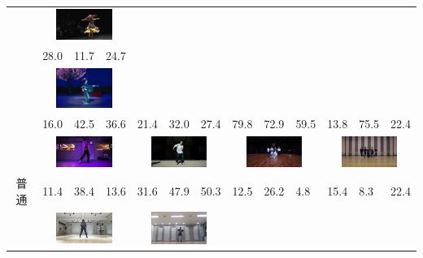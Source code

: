 \begin{table}[t]
\begin{center}
\begin{tabular}{|c|p{5mm}p{5mm}p{5mm}|p{5mm}p{5mm}p{5mm}|p{5mm}p{5mm}p{5mm}|p{5mm}p{5mm}p{5mm}|}
        & \multicolumn{3}{|c|}{\includegraphics[width=18mm]{images/snaps/belly_elegant.png}}
      \\ \cline{2-13}
        &28.0 &11.7 &24.7 & & & & & & & & & \\
        & \multicolumn{3}{|c|}{\includegraphics[width=18mm]{images/snaps/japanese2_elegant.png}}
        & \multicolumn{3}{|c|}{}
        & \multicolumn{3}{|c|}{}
        & \multicolumn{3}{|c|}{}
      \\ \hline
        &16.0 &42.5 &36.6 &21.4 &32.0 &27.4 &79.8 &72.9 &59.5 &13.8 &75.5 &22.4 \\
        & \multicolumn{3}{|c|}{\includegraphics[width=18mm]{images/snaps/ariana_dance.png}}
        & \multicolumn{3}{|c|}{\includegraphics[width=18mm]{images/snaps/kadokawa_dream_dance.png}}
        & \multicolumn{3}{|c|}{\includegraphics[width=18mm]{images/snaps/bts_group_dance.png}}
        & \multicolumn{3}{|c|}{\includegraphics[width=18mm]{images/snaps/arashi_group_dance.png}}
      \\ \cline{2-13}
      普通
        &11.4 &38.4 &13.6 &31.6 &47.9 &50.3 &12.5 &26.2 &4.8 &15.4 &8.3 &22.4 \\
        & \multicolumn{3}{|c|}{\includegraphics[width=18mm]{images/snaps/bts_dance.png}}
        & \multicolumn{3}{|c|}{\includegraphics[width=18mm]{images/snaps/manolo_dance.png}}

\end{tabular}
\end{center}
\end{table}
